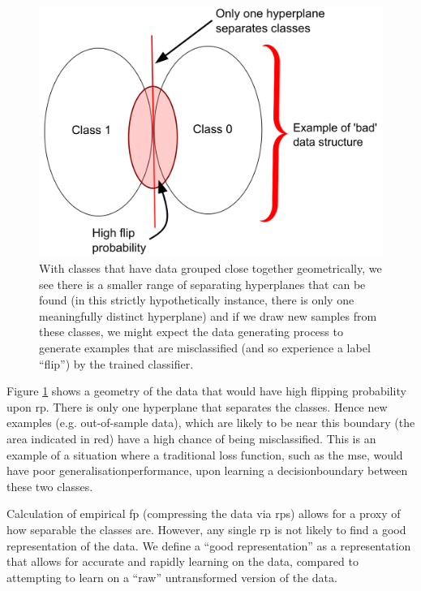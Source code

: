 
\begin{figure}[h]
    \centering
    \includegraphics[width=\textwidth]{figs/hyperplanes_poor_classes.png}
    \caption[Illustration of poorly separated classes.]{With classes that have data grouped close together geometrically, we see there is a smaller range of separating hyperplanes that can be found (in this strictly hypothetically instance, there is only one meaningfully distinct hyperplane) and if we draw new samples from these classes, we might expect the data generating process to generate examples that are misclassified (and so experience a label \enquote{flip}) by the trained classifier.}
    \label{fig:poor_sep_classes}
\end{figure}

Figure \ref{fig:poor_sep_classes} shows a geometry of the data that would have high flipping probability upon \gls{rp}. There is only one \gls{hyperplane} that separates the classes. Hence new examples (e.g. out-of-sample data), which are likely to be near this boundary (the area indicated in red) have a high chance of being misclassified. This is an example of a situation where a traditional loss function, such as the \gls{mse}, would have poor \gls{generalisationperformance}, upon learning a \gls{decisionboundary} between these two classes. 
\bigskip

Calculation of empirical \gls{fp} (compressing the data via \gls{rp}s) allows for a proxy of how separable the classes are. However, any single \gls{rp} is not likely to find a good representation of the data. We define a \enquote{good representation} as a representation that allows for accurate and rapidly learning on the data, compared to attempting to learn on a \enquote{raw} untransformed version of the data.
\bigskip

